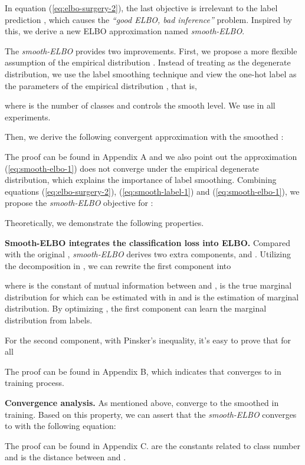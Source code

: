 \documentclass[letterpaper]{article}
\begin{document}
In equation (\ref{eq:elbo-surgery-2}), the last objective  is irrelevant to the label prediction , which causes the \textit{“good ELBO, bad inference”} problem. Inspired by this, we derive a new ELBO approximation named \textit{smooth-ELBO}. 

The \textit{smooth-ELBO} provides two improvements. First, we propose a more flexible assumption of the empirical distribution . Instead of treating  as the degenerate distribution, we use the label smoothing technique \citep{DBLP:conf/nips/MullerKH19} and view the one-hot label  as the parameters of the empirical distribution , that is, 

where  is the number of classes and  controls the smooth level. We use  in all experiments. 

Then, we derive the following convergent approximation with the smoothed :


The proof can be found in Appendix A and we also point out the approximation (\ref{eq:smooth-elbo-1}) does not converge under the empirical degenerate distribution, which explains the importance of label smoothing. Combining equations (\ref{eq:elbo-surgery-2}), (\ref{eq:smooth-label-1}) and (\ref{eq:smooth-elbo-1}), we propose the \textit{smooth-ELBO} objective for :

Theoretically, we demonstrate the following properties.

\textbf{Smooth-ELBO integrates the classification loss into ELBO.} Compared with the original , \textit{smooth-ELBO} derives two extra components,  and . Utilizing the decomposition in \citep{hoffman2016elbo}, we can rewrite the first component into 

where  is the constant of mutual information between  and ,  is the true marginal distribution for  which can be estimated with  in  and  is the estimation of marginal distribution. By optimizing , the first component can learn the marginal distribution  from labels. 

For the second component, with Pinsker's inequality, it's easy to prove that for all  

The proof can be found in Appendix B, which indicates that  converges to  in training process.

\textbf{Convergence analysis.} As mentioned above,  converge to the smoothed  in training. Based on this property, we can assert that the \textit{smooth-ELBO} converges to  with the following equation:

The proof can be found in Appendix C.  are the constants related to class number  and  is the distance between  and .
\end{document}
